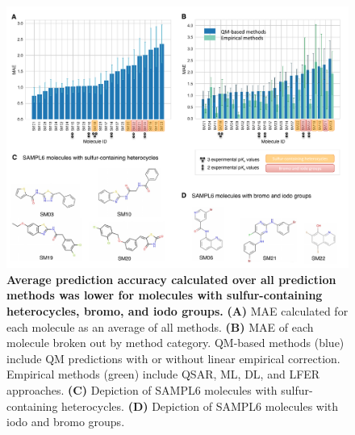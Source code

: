 \documentclass[9pt,lineno,final]{elife}
\begin{document}
\begin{figure}
\centering
\includegraphics[width=1.0\linewidth]{figures/typeIII_molecular_MAE_fig.pdf}
\caption{{\bf Average prediction accuracy calculated over all prediction methods was lower for molecules with sulfur-containing heterocycles, bromo, and iodo groups.}
{\bf(A)} MAE calculated for each molecule as an average of all methods. {\bf(B)} MAE of each molecule broken out by method category. QM-based methods (blue) include QM predictions with or without linear empirical correction. Empirical methods (green) include QSAR, ML, DL, and LFER approaches. {\bf(C)} Depiction of SAMPL6 molecules with sulfur-containing heterocycles. {\bf(D)} Depiction of SAMPL6 molecules with iodo and bromo groups.
}
\label{fig:typeIII_molecular_MAE}
\end{figure}
\end{document}
